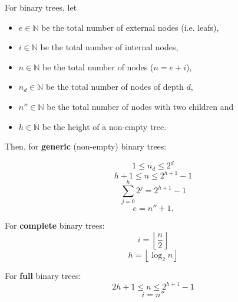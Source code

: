 \documentclass[a4paper, 10pt]{article}
\begin{document}
\begin{minipage}{0.3\linewidth}
For binary trees, let
\begin{itemize}

\item $e \in \mathbb{N}$ be the total number of external nodes (i.e. leafs),

\item $i \in \mathbb{N}$ be the total number of internal nodes,

\item $n \in \mathbb{N}$ be the total number of nodes ($n = e + i$),

\item $n_d \in \mathbb{N}$ be the total number of nodes of depth $d$,

\item $n'' \in \mathbb{N}$ be the total number of nodes with two children and

\item $h \in \mathbb{N}$ be the height of a non-empty tree.

\end{itemize}
Then, for \textbf{generic} (non-empty) binary trees:

\begin{equation}
  1 \le n_d \le 2^d
\end{equation}
\begin{equation}
  h + 1 \le n \le 2^{h+1} - 1
\end{equation}
\begin{equation}
  \sum_{j=0}^{h}2^j = 2^{h+1} - 1
\end{equation}
\begin{equation} e = n'' + 1.  \end{equation}

For \textbf{complete} binary trees:
\begin{equation}
  i = \left \lfloor{\frac{n}{2}}\right \rfloor
\end{equation}
\begin{equation}
  h = \left \lfloor{\log_2 n}\right \rfloor
\end{equation}

For \textbf{full} binary trees:
\begin{equation}
  2h + 1 \le n \le 2^{h+1} - 1
\end{equation}
\begin{equation}
  i = n''
\end{equation}

\end{minipage}
\end{document}
